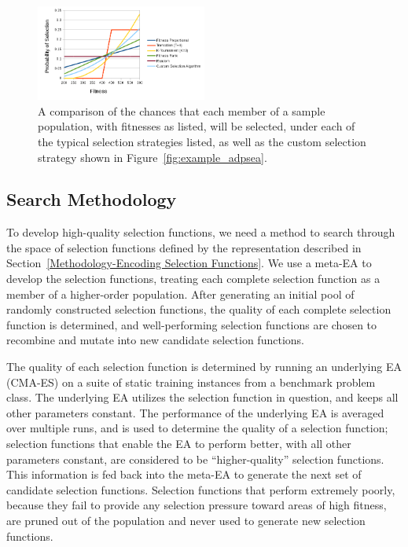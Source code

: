\documentclass[sigconf]{acmart}
\begin{document}
\begin{figure}
	\centering
	\includegraphics[width=0.5\textwidth]{selection_chances}
	\caption{A comparison of the chances that each member of a sample population, with fitnesses as listed, will be selected, under each of the typical selection strategies listed, as well as the custom selection strategy shown in Figure~\ref{fig:example_adpsea}.}
	\label{fig:selection_chances}
\end{figure}

\subsection{Search Methodology}
\label{Methodology-Search Methodology}

To develop high-quality selection functions, we need a method to search through the space of selection functions defined by the representation described in Section~\ref{Methodology-Encoding Selection Functions}. We use a meta-EA to develop the selection functions, treating each complete selection function as a member of a higher-order population. After generating an initial pool of randomly constructed selection functions, the quality of each complete selection function is determined, and well-performing selection functions are chosen to recombine and mutate into new candidate selection functions. 

The quality of each selection function is determined by running an underlying EA (CMA-ES) on a suite of static training instances from a benchmark problem class. The underlying EA utilizes the selection function in question, and keeps all other parameters constant. The performance of the underlying EA is averaged over multiple runs, and is used to determine the quality of a selection function; selection functions that enable the EA to perform better, with all other parameters constant, are considered to be ``higher-quality'' selection functions. This information is fed back into the meta-EA to generate the next set of candidate selection functions. Selection functions that perform extremely poorly, because they fail to provide any selection pressure toward areas of high fitness, are pruned out of the population and never used to generate new selection functions. 
\end{document}
